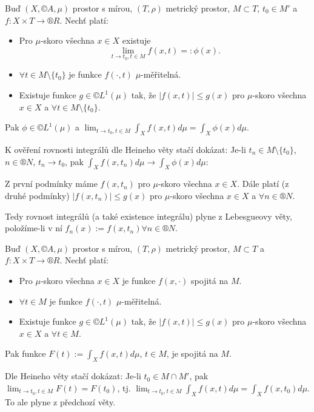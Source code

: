 \documentclass[12pt]{article}					%
\begin{document}
\begin{veta}
	Buď $(X, ©A, \mu)$ prostor s mírou, $(T, \rho)$ metrický prostor, $M \subset T$, $t_0 \in M'$ a $f: X \times T \rightarrow ®R$. Nechť platí:

	\begin{itemize}
		\item Pro $\mu$-skoro všechna $x \in X$ existuje
			$$ \lim_{t \rightarrow t_0, t \in M} f(x, t) =: \phi(x). $$
		\item $\forall t \in M \setminus \{t_0\}$ je funkce $f(·, t)$ $\mu$-měřitelná.
		\item Existuje funkce $g \in ©L^1(\mu)$ tak, že $|f(x, t)| ≤ g(x)$ pro $\mu$-skoro všechna $x \in X$ a $\forall t \in M \setminus \{t_0\}$.
	\end{itemize}

	Pak $\phi \in ©L^1(\mu)$ a $\lim_{t \rightarrow t_0, t \in M} \int_X f(x, t) d\mu = \int_X \phi(x) d\mu$.

	\begin{dukazin}
		K ověření rovnosti integrálů dle Heineho věty stačí dokázat: Je-li $t_n \in M \setminus \{t_0\}$, $n \in ®N$, $t_n \rightarrow t_0$, pak $\int_X f(x, t_n) d\mu \rightarrow \int_X \phi(x) d\mu$:

		Z první podmínky máme $f(x, t_n)$ pro $\mu$-skoro všechna $x \in X$. Dále platí (z druhé podmínky) $|f(x, t_n)| ≤ g(x)$ pro $\mu$-skoro všechna $x \in X$ a $\forall n \in ®N$.

		Tedy rovnost integrálů (a také existence integrálu) plyne z Lebesgueovy věty, položíme-li v ní $f_n(x) := f(x, t_n) \forall n \in ®N$.
	\end{dukazin}
\end{veta}

\begin{veta}
	Buď $(X, ©A, \mu)$ prostor s mírou, $(T, \rho)$ metrický prostor, $M \subset T$ a $f: X \times T \rightarrow ®R$. Nechť platí:

	\begin{itemize}
		\item Pro $\mu$-skoro všechna $x \in X$ je funkce $f(x, ·)$ spojitá na $M$.
		\item $\forall t \in M$ je funkce $f(·, t)$ $\mu$-měřitelná.
		\item Existuje funkce $g \in ©L^1(\mu)$ tak, že $|f(x, t)| ≤ g(x)$ pro $\mu$-skoro všechna $x \in X$ a $\forall t \in M$.
	\end{itemize}

	Pak funkce $F(t) := \int_X f(x, t) d\mu$, $t \in M$, je spojitá na $M$.

	\begin{dukazin}
		Dle Heineho věty stačí dokázat: Je-li $t_0 \in M \cap M'$, pak $\lim_{t \rightarrow t_0, t \in M} F(t) = F(t_0)$, tj. $\lim_{t \rightarrow t_0, t \in M} \int_X f(x, t) d\mu = \int_X f(x, t_0) d\mu$. To ale plyne z předchozí věty.
	\end{dukazin}
\end{veta}
\end{document}

